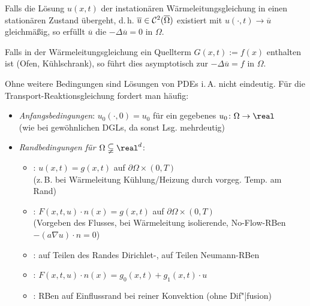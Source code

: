 \linie

\begin{Bsp}
    Falls die Lösung $u(x, t)$ der instationären Wärmeleitungsgleichung in einen stationären
    Zustand übergeht, d.\,h. $\overline{u} \in \mathcal{C}^2(\overline{\Omega})$ existiert mit
    $u(\cdot, t) \to \overline{u}$ gleichmäßig, so erfüllt $\overline{u}$ die
     $-\Delta \overline{u} = 0$ in $\Omega$.
    
    Falls in der Wärmeleitungsgleichung ein Quellterm $G(x, t) := f(x)$ enthalten ist
    (Ofen, Kühlschrank), so führt dies asymptotisch zur
     $-\Delta \overline{u} = f$ in $\Omega$.
\end{Bsp}

\linie

\begin{Bem}
    Ohne weitere Bedingungen sind Lösungen von PDEs i.\,A. nicht eindeutig.
    Für die Transport-Reaktionsgleichung fordert man häufig:
    \begin{itemize}
        \item
        \emph{Anfangsbedingungen}:
        $u_0(\cdot, 0) = u_0$ für ein gegebenes $u_0\colon \Omega \to \real$\\
        (wie bei gewöhnlichen DGLs, da sonst Lsg. mehrdeutig)
        
        \item
        \emph{Randbedingungen für $\Omega \subsetneqq \real^d$}:
        \begin{itemize}
            \item
            :
            $u(x, t) = g(x, t)$ auf $\partial\Omega \times (0, T)$\\
            (z.\,B. bei Wärmeleitung Kühlung/Heizung durch vorgeg. Temp. am Rand)
            
            \item
            :
            $F(x, t, u) \cdot n(x) = g(x, t)$ auf $\partial\Omega \times (0, T)$\\
            (Vorgeben des Flusses, bei Wärmeleitung isolierende, No-Flow-RBen
            $-(a \nabla u) \cdot n = 0$)
            
            \item
            :
            auf Teilen des Randes Dirichlet-, auf Teilen Neumann-RBen
            
            \item
            :
            $F(x, t, u) \cdot n(x) = g_0(x, t) + g_1(x, t) \cdot u$
            
            \item
            :
            RBen auf Einflussrand bei reiner Konvektion (ohne Dif"|fusion)
        \end{itemize}
    \end{itemize}
\end{Bem}

